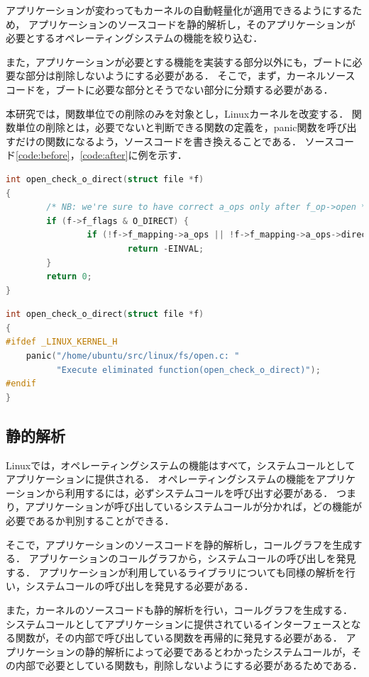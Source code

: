 \documentclass[graduation-thesis]{mlarticle}
\begin{document}
アプリケーションが変わってもカーネルの自動軽量化が適用できるようにするため，
アプリケーションのソースコードを静的解析し，そのアプリケーションが必要とするオペレーティングシステムの機能を絞り込む．

また，アプリケーションが必要とする機能を実装する部分以外にも，ブートに必要な部分は削除しないようにする必要がある．
そこで，まず，カーネルソースコードを，ブートに必要な部分とそうでない部分に分類する必要がある．

本研究では，関数単位での削除のみを対象とし，Linuxカーネルを改変する．
関数単位の削除とは，必要でないと判断できる関数の定義を，panic関数を呼び出すだけの関数になるよう，ソースコードを書き換えることである．
ソースコード\ref{code:before}，\ref{code:after}に例を示す．

\begin{lstlisting}[language=C, caption=ftruncate関数(改変前), label=code:before]
int open_check_o_direct(struct file *f)
{
        /* NB: we're sure to have correct a_ops only after f_op->open */
        if (f->f_flags & O_DIRECT) {
                if (!f->f_mapping->a_ops || !f->f_mapping->a_ops->direct_IO)
                        return -EINVAL;
        }
        return 0;
}
\end{lstlisting}
\begin{lstlisting}[language=C, caption=ftruncate関数(改変後), label=code:after]
int open_check_o_direct(struct file *f)
{
#ifdef _LINUX_KERNEL_H
    panic("/home/ubuntu/src/linux/fs/open.c: "
          "Execute eliminated function(open_check_o_direct)");
#endif
}
\end{lstlisting}

\subsection{静的解析}
\label{proposal:static}
Linuxでは，オペレーティングシステムの機能はすべて，システムコールとしてアプリケーションに提供される．
オペレーティングシステムの機能をアプリケーションから利用するには，必ずシステムコールを呼び出す必要がある．
つまり，アプリケーションが呼び出しているシステムコールが分かれば，どの機能が必要であるか判別することができる．

そこで，アプリケーションのソースコードを静的解析し，コールグラフを生成する．
アプリケーションのコールグラフから，システムコールの呼び出しを発見する．
アプリケーションが利用しているライブラリについても同様の解析を行い，システムコールの呼び出しを発見する必要がある．

また，カーネルのソースコードも静的解析を行い，コールグラフを生成する．
システムコールとしてアプリケーションに提供されているインターフェースとなる関数が，その内部で呼び出している関数を再帰的に発見する必要がある．
アプリケーションの静的解析によって必要であるとわかったシステムコールが，その内部で必要としている関数も，削除しないようにする必要があるためである．
\end{document}

